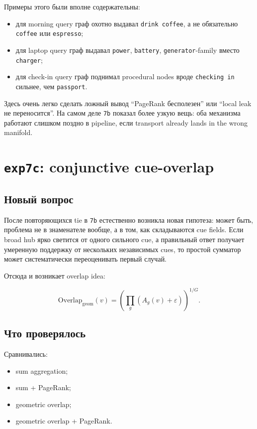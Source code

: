 Примеры этого были вполне содержательны:

\begin{itemize}[leftmargin=2em]
\item для morning query граф охотно выдавал \texttt{drink coffee}, а не обязательно
\texttt{coffee} или \texttt{espresso};
\item для laptop query граф выдавал \texttt{power}, \texttt{battery},
\texttt{generator}-family вместо \texttt{charger};
\item для check-in query граф поднимал procedural nodes вроде
\texttt{checking in} сильнее, чем \texttt{passport}.
\end{itemize}

\begin{riskbox}
Здесь очень легко сделать ложный вывод ``PageRank бесполезен'' или
``local leak не переносится''. На самом деле \texttt{7b} показал более узкую
вещь: оба механизма работают слишком поздно в pipeline, если transport already
lands in the wrong manifold.
\end{riskbox}

\section{\texttt{exp7c}: conjunctive cue-overlap}

\subsection{Новый вопрос}

После повторяющихся tie в \texttt{7b} естественно возникла новая гипотеза:
может быть, проблема не в знаменателе вообще, а в том, как складываются cue
fields. Если broad hub ярко светится от одного сильного cue, а правильный ответ
получает умеренную поддержку от нескольких независимых cues, то простой сумматор
может систематически переоценивать первый случай.

Отсюда и возникает overlap idea:

\[
\mathrm{Overlap}_{\mathrm{geom}}(v)=
\left(\prod_g (A_g(v)+\varepsilon)\right)^{1/G}.
\]

\subsection{Что проверялось}

Сравнивались:

\begin{itemize}[leftmargin=2em]
\item sum aggregation;
\item sum + PageRank;
\item geometric overlap;
\item geometric overlap + PageRank.
\end{itemize}

